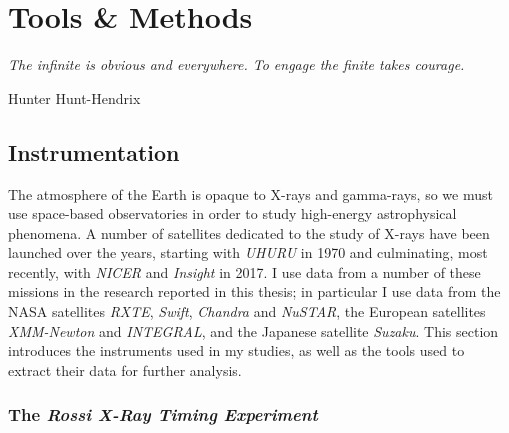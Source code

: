 \chapter{Tools \& Methods}

\epigraph{\textit{The infinite is obvious and everywhere. To engage the finite takes courage.}}{Hunter Hunt-Hendrix}

\section{Instrumentation}

\par The atmosphere of the Earth is opaque to X-rays and gamma-rays, so we must use space-based observatories in order to study high-energy astrophysical phenomena.  A number of satellites dedicated to the study of X-rays have been launched over the years, starting with \textit{UHURU} in 1970 \citep{Giacconi_Uhuru} and culminating, most recently, with \textit{NICER} \citep{Gendreau_Nicer} and \textit{Insight} \citep{Li_HXMT} in 2017.  I use data from a number of these missions in the research reported in this thesis; in particular I use data from the NASA satellites \textit{RXTE}, \textit{Swift}, \textit{Chandra} and \textit{NuSTAR}, the European satellites \textit{XMM-Newton} and \textit{INTEGRAL}, and the Japanese satellite \textit{Suzaku}.  This section introduces the instruments used in my studies, as well as the tools used to extract their data for further analysis.

\subsection{The \textit{Rossi X-Ray Timing Experiment}}

